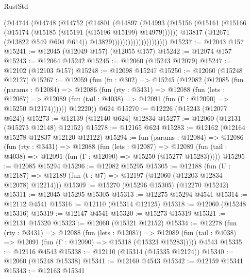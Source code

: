\begin{lexlean}{RustStd}
\begin{coremodule}
                                  (@14744
                                    (@14748
                                      (@14752
                                        (@14801
                                          (@14897
                                            (@14993
                                              (@15156
                                                (@15161
                                                  (@15166
                                                    (@15174
                                                      (@15185 (@15191 (@15196 @15199) @14979))))))
                                              @13817
                                              (@12671 (@13822 @549 @604 @614))
                                              @13829)))))))))))))))))))))
@15237 := @12043 @157
@15241 := @12045 (@12049 @157) (@12055 @157)
@15242 := @12074 @157
@15243 := @12064 @15242
@15245 := @12060 (@15243 @12079)
@15247 := @12102 (@12103 @157)
@15248 := @12098 @15247
@15250 := @12060 (@15248 @12127)
@15267 := @12059
    (fun (fn : @302) =>
    @15245
      (@12082
        (@12085
          (fun (params : @12084) =>
          @12086
            (fun (rty : @3431) =>
            @12088
              (fun (lets : @12087) =>
              @12089 (fun (tail : @4038) => @12091 (fun (Γ : @12090) => @15250 @12174))))))
        @12220))
    @624
@15270 := @12226 (@15243 (@12077 @624))
@15273 := @12139 (@12140 @624) @12834
@15277 := @12060 (@12131 (@15273 @12148) @12152)
@15278 := @12165 @624
@15283 := @12162 (@12164 @15278 @12837 @12120 @12122)
@15294 := fun (params : @12084) =>
  @12086
    (fun (rty : @3431) =>
    @12088
      (fun (lets : @12087) =>
      @12089 (fun (tail : @4038) => @12091 (fun (Γ : @12090) => @15250 (@15277 @15283)))))
@15295 := @12085 @15294
@15296 := @12082 @15295
@15305 := @12188
    (fun (U : @12187) => @12189 (fun (t : @7) => @12197 (@12060 (@12203 @12834 @12078) @12214)))
@15309 := @15270 (@15296 @15305) (@12270 @15242)
@15311 := @12045 @15295 @15305
@15313 := @12275 @15294 @4541
@15314 := @12112 @4541
@15316 := @12110 (@15314 @12125)
@15318 := @12060 (@15248 @15316)
@15319 := @12147 @4541
@15320 := @15273 @15319
@15321 := @12131 @15320
@15323 := @12060 (@15321 @12152)
@15334 := @12278
    (fun (rty : @3431) =>
    @12088
      (fun (lets : @12087) =>
      @12089 (fun (tail : @4038) => @12091 (fun (Γ : @12090) => @15318 (@15323 @15283)))))
    @4543
@15335 := @12116 @4543
@15338 := @12110 (@15314 (@15335 @12124))
@15340 := @12060 (@15248 @15338)
@15341 := @12160 @4543
@15342 := @12159 @15341
@15343 := @12163 @15341

\end{coremodule}
\end{lexlean}
